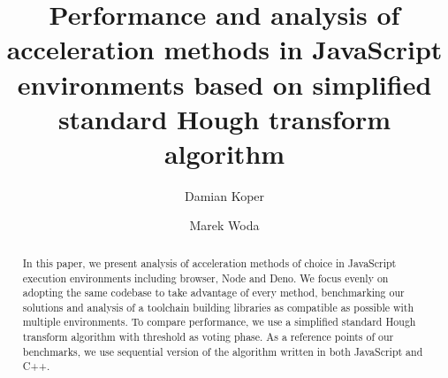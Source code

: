 \documentclass[runningheads]{llncs}
\begin{document}
%
\title{Performance and analysis of acceleration methods in JavaScript environments based on simplified standard Hough transform algorithm}
%

\author{Damian Koper \and Marek Woda}
%
%
%
\maketitle              %
%
\begin{abstract}
  In this paper, we present analysis of acceleration methods of choice in JavaScript execution environments including browser, Node and Deno.  We focus evenly on adopting the same codebase to take advantage of every method, benchmarking our solutions and analysis of a toolchain building libraries as compatible as possible with multiple environments. To compare performance, we use a simplified standard Hough transform algorithm with threshold as voting phase. As a reference points of our benchmarks, we use sequential version of the algorithm written in both JavaScript and C++.

\end{abstract}



%

\clearpage
 


\end{document}
